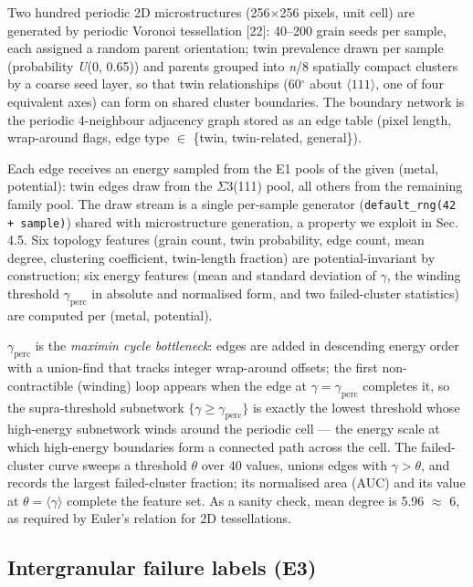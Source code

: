 \documentclass[12pt]{article}
\begin{document}
Two hundred periodic 2D microstructures (256$\times$256 pixels, unit cell) are generated by periodic Voronoi tessellation [22]: 40--200 grain seeds per sample, each assigned a random parent orientation; twin prevalence drawn per sample (probability \textit{U}(0, 0.65)) and parents grouped into \textit{n}/8 spatially compact clusters by a coarse seed layer, so that twin relationships (60$^\circ$ about $\langle 111\rangle$, one of four equivalent axes) can form on shared cluster boundaries. The boundary network is the periodic 4-neighbour adjacency graph stored as an edge table (pixel length, wrap-around flags, edge type $\in$ \{twin, twin-related, general\}).

Each edge receives an energy sampled from the E1 pools of the given (metal, potential): twin edges draw from the $\Sigma$3(111) pool, all others from the remaining family pool. The draw stream is a single per-sample generator (\texttt{default\_rng(42 + sample)}) shared with microstructure generation, a property we exploit in Sec. 4.5. Six topology features (grain count, twin probability, edge count, mean degree, clustering coefficient, twin-length fraction) are potential-invariant by construction; six energy features (mean and standard deviation of $\gamma$, the winding threshold $\gamma_{\mathrm{perc}}$ in absolute and normalised form, and two failed-cluster statistics) are computed per (metal, potential).

$\gamma_{\mathrm{perc}}$ is the \textit{maximin cycle bottleneck}: edges are added in descending energy order with a union-find that tracks integer wrap-around offsets; the first non-contractible (winding) loop appears when the edge at $\gamma = \gamma_{\mathrm{perc}}$ completes it, so the supra-threshold subnetwork $\{\gamma \ge \gamma_{\mathrm{perc}}\}$ is exactly the lowest threshold whose high-energy subnetwork winds around the periodic cell --- the energy scale at which high-energy boundaries form a connected path across the cell. The failed-cluster curve sweeps a threshold $\theta$ over 40 values, unions edges with $\gamma > \theta$, and records the largest failed-cluster fraction; its normalised area (AUC) and its value at $\theta = \langle\gamma\rangle$ complete the feature set. As a sanity check, mean degree is 5.96 $\approx$ 6, as required by Euler's relation for 2D tessellations.

\subsection{Intergranular failure labels (E3)}
\end{document}
